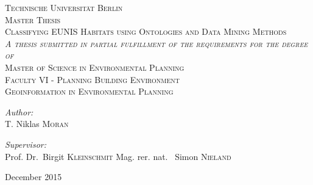 \begin{titlepage}
\begin{center}

\textsc{\LARGE Technische Universit\"at Berlin}\\[0.5cm]
\textsc{Master Thesis}\\[1.5cm]

\textsc{\Large Classifying EUNIS Habitats using Ontologies and Data Mining
Methods}\\[1.5cm]
\textsc{\textit{A thesis submitted in partial fulfillment of the requirements
for the degree of}}\\[1.25cm]
\textsc{\Large Master of Science in Environmental Planning}\\[1.5cm]
\textsc{Faculty VI - Planning Building Environment\\
 Geoinformation in Environmental Planning}\\[1.5cm]

\noindent
\begin{minipage}{0.5\textwidth}
\begin{flushleft} \large
\emph{Author:}\\
T. Niklas \textsc{Moran}
\end{flushleft}
\end{minipage}%
\begin{minipage}{0.5\textwidth}
\begin{flushright} \large
\emph{Supervisor:} \\
Prof. Dr.~Birgit \textsc{Kleinschmit}
Mag. rer. nat. ~Simon \textsc{Nieland}
\end{flushright}
\end{minipage}

\vfill

{\large December 2015}

\end{center}
\end{titlepage}
